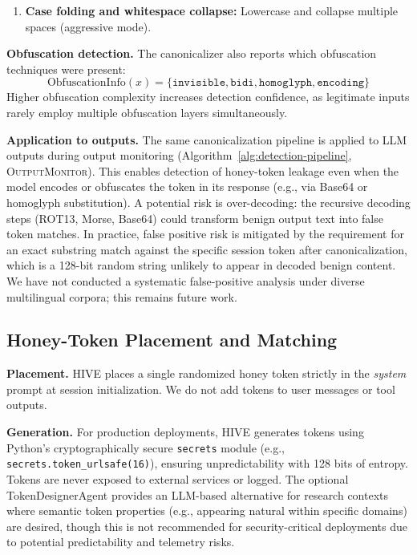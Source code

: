 \documentclass[manuscript,screen,review]{acmart}
\begin{document}
\begin{enumerate}
\item \textbf{Case folding and whitespace collapse:} Lowercase and collapse multiple spaces (aggressive mode).
\end{enumerate}

\textbf{Obfuscation detection.} The canonicalizer also reports which obfuscation techniques were present:
\begin{equation*}
\mathrm{ObfuscationInfo}(x) = \{\texttt{invisible}, \texttt{bidi}, \texttt{homoglyph}, \texttt{encoding}\}
\end{equation*}
Higher obfuscation complexity increases detection confidence, as legitimate inputs rarely employ multiple obfuscation layers simultaneously.

\textbf{Application to outputs.} The same canonicalization pipeline is applied to LLM outputs during output monitoring (Algorithm~\ref{alg:detection-pipeline}, \textsc{OutputMonitor}). This enables detection of honey-token leakage even when the model encodes or obfuscates the token in its response (e.g., via Base64 or homoglyph substitution). A potential risk is over-decoding: the recursive decoding steps (ROT13, Morse, Base64) could transform benign output text into false token matches. In practice, false positive risk is mitigated by the requirement for an exact substring match against the specific session token after canonicalization, which is a 128-bit random string unlikely to appear in decoded benign content. We have not conducted a systematic false-positive analysis under diverse multilingual corpora; this remains future work.

\subsection{Honey-Token Placement and Matching}
\label{sec:token-placement-matching}

\textbf{Placement.} HIVE places a single randomized honey token strictly in the \emph{system} prompt at session initialization. We do not add tokens to user messages or tool outputs.

\textbf{Generation.} For production deployments, HIVE generates tokens using Python's cryptographically secure \texttt{secrets} module (e.g., \texttt{secrets.token\_urlsafe(16)}), ensuring unpredictability with 128 bits of entropy. Tokens are never exposed to external services or logged. The optional TokenDesignerAgent provides an LLM-based alternative for research contexts where semantic token properties (e.g., appearing natural within specific domains) are desired, though this is not recommended for security-critical deployments due to potential predictability and telemetry risks.
\end{document}
